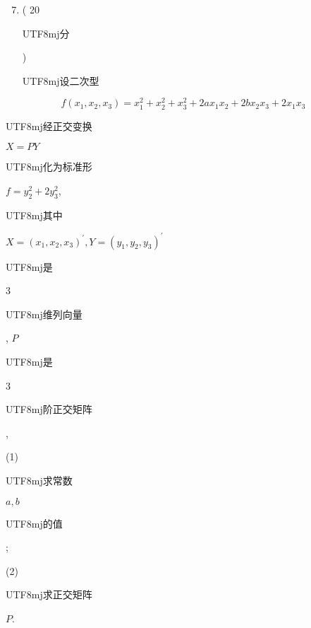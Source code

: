 \documentclass[10pt]{article}
\begin{document}
\begin{enumerate}
  \setcounter{enumi}{6}
  \item ( 20 \begin{CJK}{UTF8}{mj}分\end{CJK}) \begin{CJK}{UTF8}{mj}设二次型\end{CJK}
\end{enumerate}
$$
f\left(x_{1}, x_{2}, x_{3}\right)=x_{1}^{2}+x_{2}^{2}+x_{3}^{2}+2 a x_{1} x_{2}+2 b x_{2} x_{3}+2 x_{1} x_{3}
$$
\begin{CJK}{UTF8}{mj}经正交变换\end{CJK} $X=P Y$ \begin{CJK}{UTF8}{mj}化为标准形\end{CJK} $f=y_{2}^{2}+2 y_{3}^{2}$, \begin{CJK}{UTF8}{mj}其中\end{CJK} $X=\left(x_{1}, x_{2}, x_{3}\right)^{\prime}, Y=\left(y_{1}, y_{2}, y_{3}\right)^{\prime}$ \begin{CJK}{UTF8}{mj}是\end{CJK} 3 \begin{CJK}{UTF8}{mj}维列向量\end{CJK}, $P$ \begin{CJK}{UTF8}{mj}是\end{CJK} 3 \begin{CJK}{UTF8}{mj}阶正交矩阵\end{CJK},

(1) \begin{CJK}{UTF8}{mj}求常数\end{CJK} $a, b$ \begin{CJK}{UTF8}{mj}的值\end{CJK};

(2) \begin{CJK}{UTF8}{mj}求正交矩阵\end{CJK} $P$.
\end{document}
